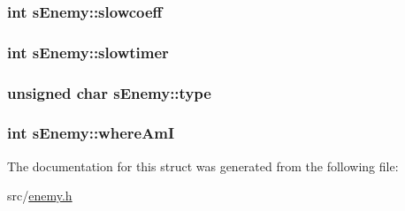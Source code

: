 \hypertarget{structs_enemy_a201f8e838aa8f1c91c35fd6c92d5acf3}{
\subsubsection[{slowcoeff}]{\setlength{\rightskip}{0pt plus 5cm}int s\-Enemy\-::slowcoeff}}\label{structs_enemy_a201f8e838aa8f1c91c35fd6c92d5acf3}
\hypertarget{structs_enemy_a288d3987c9819d3a37f33d3649a8f8f2}{
\subsubsection[{slowtimer}]{\setlength{\rightskip}{0pt plus 5cm}int s\-Enemy\-::slowtimer}}\label{structs_enemy_a288d3987c9819d3a37f33d3649a8f8f2}
\hypertarget{structs_enemy_a489802fdb01def60e2cca9b238887d02}{
\subsubsection[{type}]{\setlength{\rightskip}{0pt plus 5cm}unsigned char s\-Enemy\-::type}}\label{structs_enemy_a489802fdb01def60e2cca9b238887d02}
\hypertarget{structs_enemy_aff7c9c05f34dce9562407d02737b6b57}{
\subsubsection[{where\-Am\-I}]{\setlength{\rightskip}{0pt plus 5cm}int s\-Enemy\-::where\-Am\-I}}\label{structs_enemy_aff7c9c05f34dce9562407d02737b6b57}


The documentation for this struct was generated from the following file\-:\begin{DoxyCompactItemize}
\item 
src/\hyperlink{enemy_8h}{enemy.\-h}\end{DoxyCompactItemize}
